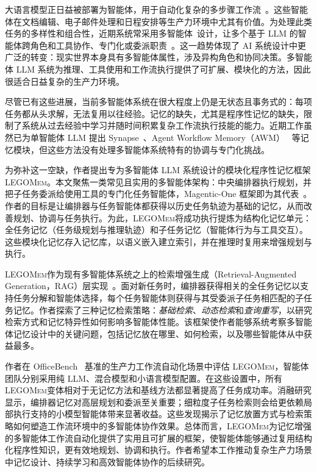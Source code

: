 \documentclass[10pt,twocolumn]{article}
\newcommand{\legomem}{\textsc{LEGOMem}}
\begin{document}
大语言模型正日益被部署为智能体，用于自动化复杂的多步骤工作流~\cite{yao2023react, song2023llm, wang2023plan, kim2024llm, wang2024officebench, xie2024osworld, wang2025odysseybench, zhou2023webarena, mialon2023gaia, cao2024spider2, rana2023sayplan, ahn2022can, wang2024survey, cheng2024exploring}。这些智能体在文档编辑、电子邮件处理和日程安排等生产力环境中尤其有价值。为处理此类任务的多样性和组合性，近期系统常采用多智能体~\cite{stone2000multiagent, 10.5555/1695886}设计，让多个基于 LLM 的智能体跨角色和工具协作、专门化或委派职责~\cite{fourney2024magentic, wu2024autogen, dang2025multi, chen2023agentverse, zhang2024ufo}。这一趋势体现了 AI 系统设计中更广泛的转变：现实世界本身具有多智能体属性，涉及异构角色和协同决策。多智能体 LLM 系统为推理、工具使用和工作流执行提供了可扩展、模块化的方法，因此很适合日益复杂的生产力环境。

尽管已有这些进展，当前多智能体系统在很大程度上仍是无状态且事务式的：每项任务都从头求解，无法复用以往经验。记忆的缺失，尤其是程序性记忆的缺失，限制了系统从过去经验中学习并随时间积累复杂工作流执行技能的能力。近期工作虽然已为单智能体 LLM 提出 Synapse~\cite{zheng2023synapse}、Agent Workflow Memory（AWM）~\cite{wangAgentWorkflowMemory2024} 等记忆模块，但这些方法没有处理多智能体系统特有的协调与专门化挑战。

为弥补这一空缺，作者提出专为多智能体 LLM 系统设计的模块化程序性记忆框架 \legomem。本文聚焦一类常见且实用的多智能体架构：中央编排器执行规划，并把子任务委派给使用工具的专门化任务智能体，Magentic-One 框架即为其代表~\cite{fourney2024magentic, wu2024autogen}。作者的目标是让编排器与任务智能体都获得以历史任务轨迹为基础的记忆，从而改善规划、协调与任务执行。为此，\legomem 将成功执行提炼为结构化记忆单元：全任务记忆（任务级规划与推理轨迹）和子任务记忆（智能体行为与工具交互）。这些模块化记忆存入记忆库，以语义嵌入建立索引，并在推理时复用来增强规划与执行。

\legomem 作为现有多智能体系统之上的检索增强生成（Retrieval-Augmented Generation，RAG）层实现~\cite{lewis2020retrieval, gao2023retrieval, douze2024faiss}。面对新任务时，编排器获得相关的全任务记忆以支持任务分解和智能体选择，每个任务智能体则获得与其受委派子任务相匹配的子任务记忆。作者探索了三种记忆检索策略：\emph{基础检索}、\emph{动态检索}和\emph{查询重写}，以研究检索方式和记忆特异性如何影响多智能体性能。该框架使作者能够系统考察多智能体记忆设计中的关键问题，包括记忆放在哪里、如何检索，以及哪些智能体从中获益最多。

作者在 OfficeBench~\cite{wang2024officebench} 基准的生产力工作流自动化场景中评估 \legomem，智能体团队分别采用纯 LLM、混合模型和小语言模型配置。在这些设置中，所有 \legomem 变体相对于无记忆方法和基线方法都显著提高了任务成功率。消融研究显示，编排器记忆对高层规划和委派至关重要；细粒度子任务检索则会给更依赖局部执行支持的小模型智能体带来显著收益。这些发现揭示了记忆放置方式与检索策略如何塑造工作流环境中的多智能体协作效果。总体而言，\legomem 为记忆增强的多智能体工作流自动化提供了实用且可扩展的框架，使智能体能够通过复用结构化程序性知识，更有效地规划、协调和执行。作者希望本工作推动复杂生产力场景中记忆设计、持续学习和高效智能体协作的后续研究。
\end{document}
